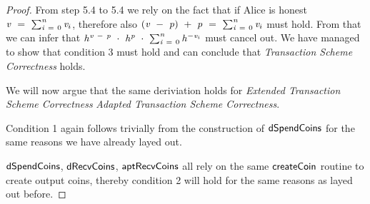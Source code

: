 \begin{proof}
    From step 5.4 to 5.4 we rely on the fact that if Alice is honest $\mathit{v} ~=~ \sum_{\mathit{i} ~=~ 0}^{\mathit{n}} \mathit{v}_i$, therefore also $(\mathit{v} ~-~ \mathit{p}) ~+~\mathit{p} ~=~ \sum_{\mathit{i} ~=~ 0}^{\mathit{n}} \mathit{v}_i$ must hold.
    From that we can infer that $\mathit{h}^{\mathit{v} ~-~ \mathit{p}} ~\cdot~ \mathit{h}^{\mathit{p}} ~\cdot~ \sum_{\mathit{i} ~=~ 0}^{\mathit{n}} \mathit{h}^{- \mathit{v}_i}$ must cancel out.
    We have managed to show that condition 3 must hold and can conclude that \emph{Transaction Scheme Correctness} holds.

    We will now argue that the same deriviation holds for \emph{Extended Transaction Scheme Correctness} \emph{Adapted Transaction Scheme Correctness}.

    Condition 1 again follows trivially from the construction of $\mathsf{dSpendCoins}$ for the same reasons we have already layed out.

    $\mathsf{dSpendCoins}$, $\mathsf{dRecvCoins}$, $\mathsf{aptRecvCoins}$ all rely on the same $\mathsf{createCoin}$ routine to create output coins, thereby condition 2 will hold for the same reasons as layed out before.


\end{proof}
